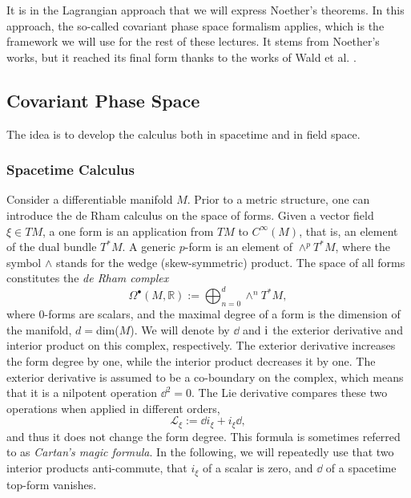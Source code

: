  It is in the Lagrangian approach that we will express Noether's theorems. In this approach, the so-called covariant phase space formalism applies, which is the framework we will use for the rest of these lectures. It stems from Noether's works, but it reached its final form thanks to the works of Wald et al. \cite{Lee:1990nz,Wald:1993nt,Iyer:1994ys,Iyer:1995kg,Wald:1999wa}.
 
 \subsection{Covariant Phase Space}
 The idea is to develop the calculus both in spacetime and in field space.
 
\subsubsection*{Spacetime Calculus} Consider a differentiable manifold $M$. Prior to a metric structure, one can introduce the de Rham calculus on the space of forms. Given a vector field $\xi\in TM$, a one form is an application from $TM$ to $C^\infty(M)$, that is, an element of the dual bundle $T^*M$. A generic $p$-form is an element of $\wedge^pT^*M$, where the symbol $\wedge$ stands for the wedge (skew-symmetric) product. The space of all forms constitutes the \textit{de Rham complex}
\begin{equation}
	\Omega^\bullet(M,\mathbb{R}):=\bigoplus_{n=0}^d\wedge^n T^*M,
\end{equation}
where $0$-forms are scalars, and the maximal degree of a form is the dimension of the manifold, $d =$dim($M$). We will denote by $\dd $ and $\mathrm{i}$ the exterior derivative and interior product on this complex, respectively. The exterior derivative increases the form degree by one, while the interior product decreases it by one. The exterior derivative is assumed to be a co-boundary on the complex, which means that it is a nilpotent operation $\dd^2=0$. The Lie derivative compares these two operations when applied in different orders,
\begin{equation}
	\mathcal{L}_\xi:=\dd i_\xi + i_\xi\dd ,
\end{equation}
and thus it does not change the form degree. This formula is sometimes referred to as \textit{Cartan’s magic formula}. In the following, we will repeatedly use that two interior products anti-commute, that $i_\xi $ of a scalar is zero, and $\dd $ of a spacetime top-form vanishes.

